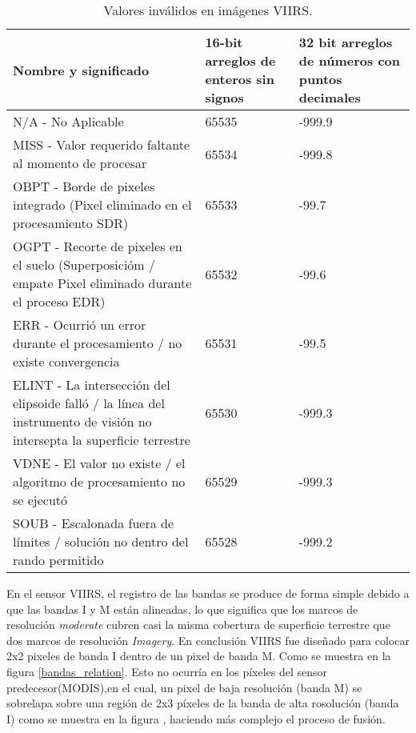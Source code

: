 \begin{table}[ht!]

\begin{center}
\begin{tabular}{| p{6cm} | p{2.5cm} | p{2.5cm} |}
\hline
Nombre y significado & 16-bit arreglos de enteros sin signos & 32 bit arreglos de números con puntos decimales \\
\hline
N/A - No Aplicable & 65535 & -999.9 \\
\hline
MISS - Valor requerido faltante al momento de procesar &  65534 & -999.8\\
\hline
OBPT - Borde de pixeles integrado (Pixel eliminado en el procesamiento SDR) & 65533 &-99.7\\
\hline
OGPT - Recorte de pixeles en el suelo (Superposicióm / empate Pixel eliminado durante el proceso EDR) & 65532 & -99.6 \\
\hline
ERR - Ocurrió un error durante el procesamiento / no existe convergencia & 65531 & -99.5 \\
\hline
ELINT - La intersección del elipsoide falló / la línea del instrumento de visión no intersepta la superficie terrestre & 65530 & -999.3 \\
\hline
VDNE - El valor no existe / el algoritmo de procesamiento no se ejecutó & 65529 & -999.3 \\
\hline
SOUB - Escalonada fuera de límites / solución no dentro del rando permitido & 65528 & -999.2 \\
\hline

\end{tabular}
\end{center}
\caption{Valores inválidos en imágenes VIIRS.} \label{invalid_values}

\end{table}


En el sensor VIIRS, el registro de las bandas se produce de forma simple debido a que las bandas I y M están alineadas, lo que significa que los marcos de resolución \textit{moderate} cubren casi la misma cobertura de superficie terrestre que dos marcos de resolución \textit{Imagery}. En conclusión VIIRS fue diseñado para colocar 2x2 pixeles de banda I dentro de un pixel de banda M. Como se muestra en la figura \ref{bandas_relation}. Esto no ocurría en los píxeles del sensor predecesor(MODIS),en el cual, un pixel de baja resolución (banda M) se sobrelapa sobre una región de 2x3 píxeles de la banda de alta rosolución (banda I) como se muestra en la figura , haciendo más complejo el proceso de fusión. 


